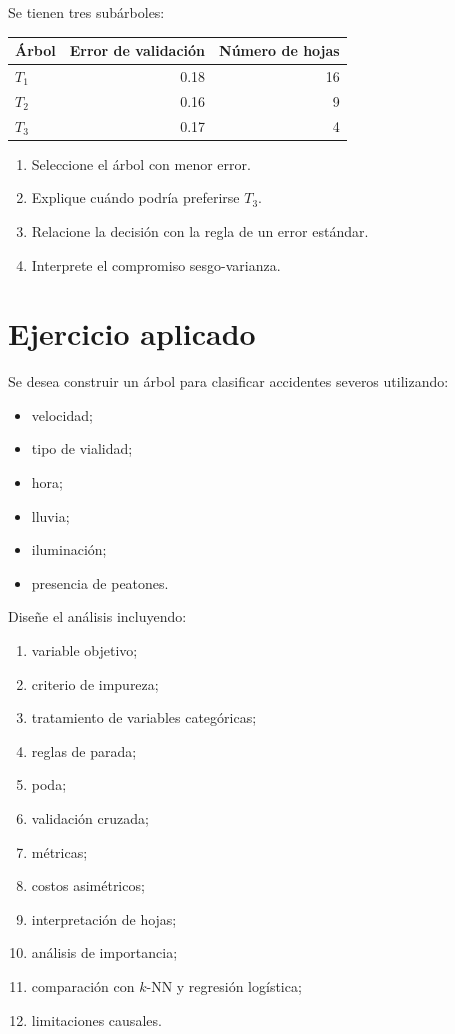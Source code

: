 \documentclass[
  spanish,
  11pt,
  letterpaper,
  DIV=11,
  numbers=noendperiod]{scrreprt}
\newcounter{none} %
\providecommand{\tightlist}{%
  \setlength{\itemsep}{0pt}\setlength{\parskip}{0pt}}
\theoremstyle{definition}
\theoremstyle{plain}
\theoremstyle{definition}
\theoremstyle{remark}
\begin{document}
Se tienen tres subárboles:

{\def\LTcaptype{none} %
\begin{longtable}[]{@{}lrr@{}}
\toprule\noalign{}
Árbol & Error de validación & Número de hojas \\
\midrule\noalign{}
\endhead
\bottomrule\noalign{}
\endlastfoot
\(T_1\) & 0.18 & 16 \\
\(T_2\) & 0.16 & 9 \\
\(T_3\) & 0.17 & 4 \\
\end{longtable}
}

\begin{enumerate}
\def\labelenumi{\arabic{enumi}.}
\tightlist
\item
  Seleccione el árbol con menor error.
\item
  Explique cuándo podría preferirse \(T_3\).
\item
  Relacione la decisión con la regla de un error estándar.
\item
  Interprete el compromiso sesgo-varianza.
\end{enumerate}

\section{Ejercicio aplicado}\label{ejercicio-aplicado-10}

Se desea construir un árbol para clasificar accidentes severos
utilizando:

\begin{itemize}
\tightlist
\item
  velocidad;
\item
  tipo de vialidad;
\item
  hora;
\item
  lluvia;
\item
  iluminación;
\item
  presencia de peatones.
\end{itemize}

Diseñe el análisis incluyendo:

\begin{enumerate}
\def\labelenumi{\arabic{enumi}.}
\tightlist
\item
  variable objetivo;
\item
  criterio de impureza;
\item
  tratamiento de variables categóricas;
\item
  reglas de parada;
\item
  poda;
\item
  validación cruzada;
\item
  métricas;
\item
  costos asimétricos;
\item
  interpretación de hojas;
\item
  análisis de importancia;
\item
  comparación con \(k\)-NN y regresión logística;
\item
  limitaciones causales.
\end{enumerate}
\end{document}
